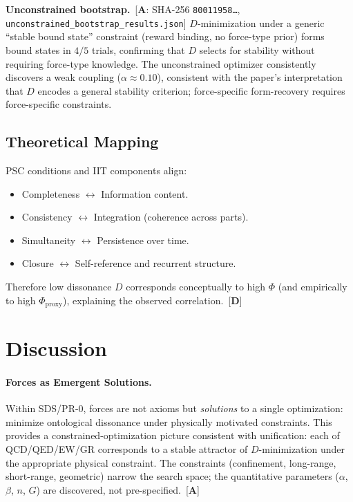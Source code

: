 \documentclass[12pt]{article}
\newcommand{\CatA}{\textbf{A}}
\newcommand{\CatD}{\textbf{D}}
\begin{document}
\begin{sloppypar}
\noindent\textbf{Unconstrained bootstrap.}~[$\CatA$: SHA-256 \texttt{80011958\ldots}, \texttt{unconstrained\_bootstrap\_results.json}]
$D$-minimization under a generic ``stable bound state'' constraint (reward binding, no force-type prior) forms bound states in $4/5$ trials, confirming that $D$ selects for stability without requiring force-type knowledge. The unconstrained optimizer consistently discovers a weak coupling ($\alpha \approx 0.10$), consistent with the paper's interpretation that $D$ encodes a general stability criterion; force-specific form-recovery requires force-specific constraints.
\end{sloppypar}

\subsection{Theoretical Mapping}
PSC conditions and IIT components align:
\begin{itemize}[leftmargin=1.2em]
  \item Completeness $\leftrightarrow$ Information content.
  \item Consistency $\leftrightarrow$ Integration (coherence across parts).
  \item Simultaneity $\leftrightarrow$ Persistence over time.
  \item Closure $\leftrightarrow$ Self-reference and recurrent structure.
\end{itemize}
Therefore low dissonance $D$ corresponds conceptually to high $\Phi$ (and empirically to high $\Phi_{\mathrm{proxy}}$), explaining the observed correlation.~[$\CatD$]

\section{Discussion}\label{sec:discussion}
\paragraph{Forces as Emergent Solutions.} Within SDS/PR-0, forces are not axioms but \emph{solutions} to a single optimization: minimize ontological dissonance under physically motivated constraints. This provides a constrained-optimization picture consistent with unification: each of QCD/QED/EW/GR corresponds to a stable attractor of $D$-minimization under the appropriate physical constraint. The constraints (confinement, long-range, short-range, geometric) narrow the search space; the quantitative parameters ($\alpha$, $\beta$, $n$, $G$) are discovered, not pre-specified.~[$\CatA$]
\end{document}

